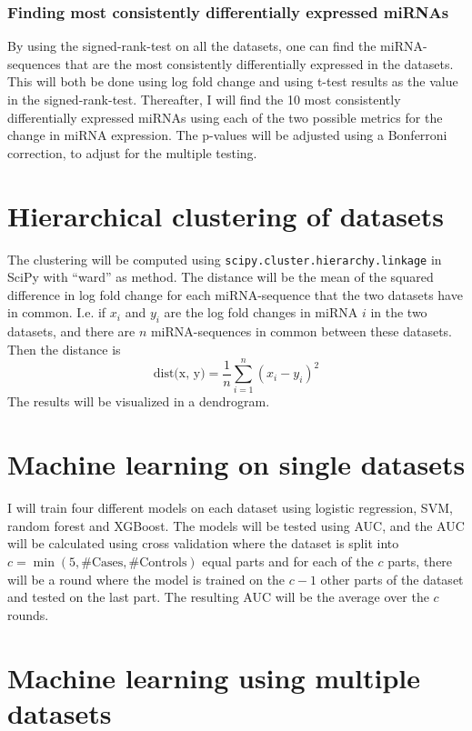 \subsubsection{Finding most consistently differentially expressed miRNAs}
\label{subsubsec:met_singed_rank_no_cv}
By using the signed-rank-test on all the datasets, one can find the miRNA-sequences that are the most consistently differentially expressed in the datasets. This will both be done using log fold change and using t-test results as the value in the signed-rank-test. Thereafter, I will find the 10 most consistently differentially expressed miRNAs using each of the two possible metrics for the change in miRNA expression. The p-values will be adjusted using a Bonferroni correction, to adjust for the multiple testing. 

\section{Hierarchical clustering of datasets}
\label{sec:hierarchical_clustering_met}
The clustering will be computed using \verb|scipy.cluster.hierarchy.linkage| in SciPy with ``ward'' as method. The distance will be the mean of the squared difference in log fold change for each miRNA-sequence that the two datasets have in common. I.e. if $x_i$ and $y_i$ are the log fold changes in miRNA $i$ in the two datasets, and there are $n$ miRNA-sequences in common between these datasets. Then the distance is 
$$\text{dist(x, y)} = \frac{1}{n} \sum_{i=1}^n \left(x_i - y_i\right)^2$$
The results will be visualized in a dendrogram. 

\section{Machine learning on single datasets}
\label{sec:machine_learning_single}
I will train four different models on each dataset using logistic regression, SVM, random forest and XGBoost. The models will be tested using AUC, and the AUC will be calculated using cross validation where the dataset is split into $c = \min(5, \text{\#Cases}, \text{\#Controls})$ equal parts and for each of the $c$ parts, there will be a round where the model is trained on the $c-1$ other parts of the dataset and tested on the last part. The resulting AUC will be the average over the $c$ rounds. %

\section{Machine learning using multiple datasets}

